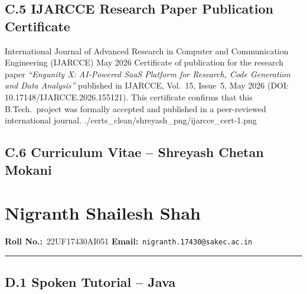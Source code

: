 \subsection*{C.5 \quad IJARCCE Research Paper Publication Certificate}

\certentry
  {International Journal of Advanced Research in Computer and Communication Engineering (IJARCCE)}
  {May 2026}
  {Certificate of publication for the research paper \textit{``Engunity X: AI-Powered SaaS Platform
   for Research, Code Generation and Data Analysis''} published in IJARCCE,
   Vol.~15, Issue~5, May 2026 (DOI: 10.17148/IJARCCE.2026.155121).
   This certificate confirms that this B.Tech.~project was formally accepted
   and published in a peer-reviewed international journal.}
  {./certs_clean/shreyash_png/ijarcce_cert-1.png}

\clearpage
\subsection*{C.6 \quad Curriculum Vitae -- Shreyash Chetan Mokani}



\clearpage
\section{Nigranth Shailesh Shah}
\label{sec:certs-nigranth}

\noindent\textbf{Roll No.:}~22UF17430AI051 \qquad
\textbf{Email:}~\texttt{nigranth.17430@sakec.ac.in}

\vspace{0.4em}\noindent\rule{\linewidth}{0.4pt}\vspace{0.6em}

\subsection*{D.1 \quad Spoken Tutorial -- Java}

